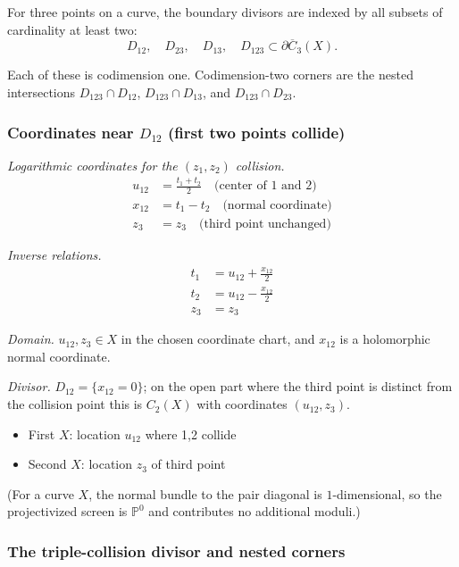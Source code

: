 \begin{example}\label{ex:coords-n3}
For three points on a curve, the boundary divisors are indexed by all
subsets of cardinality at least two:
\[
D_{12},\quad D_{23},\quad D_{13},\quad D_{123}
\subset \partial\overline{C}_3(X).
\]

Each of these is codimension one. Codimension-two corners are the
nested intersections $D_{123}\cap D_{12}$,
$D_{123}\cap D_{13}$, and $D_{123}\cap D_{23}$.

\subsubsection{\texorpdfstring{Coordinates near $D_{12}$ (first two points collide)}{Coordinates near D 12 (first two points collide)}}

\emph{Logarithmic coordinates for the $(z_1,z_2)$ collision.}
\begin{align}
u_{12} &= \frac{t_1 + t_2}{2} \quad \text{(center of 1 and 2)}\\
x_{12} &= t_1 - t_2 \quad \text{(normal coordinate)}\\
z_3 &= z_3 \quad \text{(third point unchanged)}
\end{align}

\emph{Inverse relations.}
\begin{align}
t_1 &= u_{12} + \frac{x_{12}}{2}\\
t_2 &= u_{12} - \frac{x_{12}}{2}\\
z_3 &= z_3
\end{align}

\emph{Domain.} $u_{12},z_3\in X$ in the chosen coordinate chart, and
$x_{12}$ is a holomorphic normal coordinate.

\emph{Divisor.} $D_{12}=\{x_{12}=0\}$; on the open part where the
third point is distinct from the collision point this is
$C_2(X)$ with coordinates $(u_{12},z_3)$.
\begin{itemize}
\item First $X$: location $u_{12}$ where 1,2 collide
\item Second $X$: location $z_3$ of third point
\end{itemize}
(For a curve $X$, the normal bundle to the pair diagonal is
$1$-dimensional, so the projectivized screen is $\mathbb{P}^0$ and
contributes no additional moduli.)

\subsubsection{The triple-collision divisor and nested corners}


\end{example}
